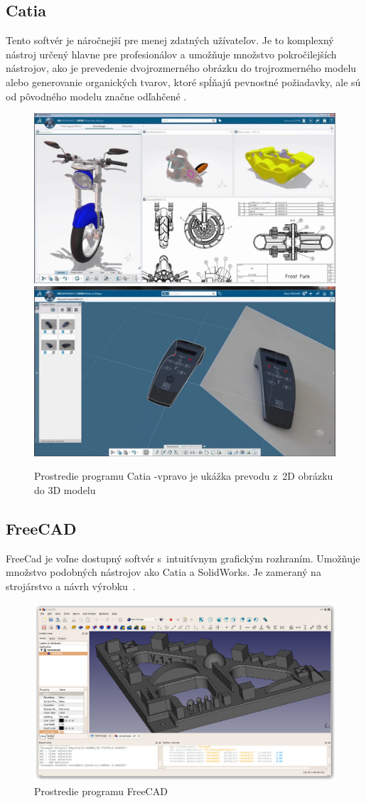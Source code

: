 
\subsection*{Catia}
Tento softvér je náročnejší pre menej zdatných užívateľov. Je to komplexný nástroj určený hlavne pre profesionálov a umožňuje množstvo pokročilejších nástrojov, ako je prevedenie dvojrozmerného obrázku do trojrozmerného modelu alebo generovanie organických tvarov, ktoré spĺňajú pevnostné požiadavky, ale sú od pôvodného modelu značne odľahčené \cite{gaget_2018}.\nopagebreak
\begin{figure}[H]
    \centering
    \includegraphics[width = 0.49\linewidth]{obrazky-figures/programs/Catia.jpg}
    \includegraphics[width = 0.49\linewidth]{obrazky-figures/programs/Catia2.png}
    \caption{Prostredie programu Catia -vpravo je ukážka prevodu z~2D obrázku do 3D modelu\protect\footnotemark
    }
    \label{fig:Catia}
\end{figure}


\subsection*{FreeCAD}
FreeCad je voľne dostupný softvér s~intuitívnym grafickým rozhraním. Umožňuje množstvo podobných nástrojov ako Catia a SolidWorks. Je zameraný na strojárstvo a návrh výrobku~\cite{freecad_2015}.\nopagebreak
\begin{figure}[H]
    \centering
    \includegraphics[width = 0.5\linewidth]{obrazky-figures/programs/Freecad_default.jpg}
    \caption{Prostredie programu FreeCAD \cite{freecad_2015}}
    \label{fig:FreeCAD}
\end{figure}


